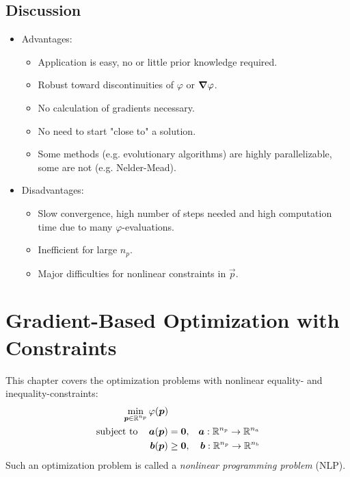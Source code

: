 	\section{Discussion}
		\begin{itemize}
			\item Advantages:
				\begin{itemize}
					\item Application is easy, no or little prior knowledge required.
					\item Robust toward discontinuities of \(\varphi\) or \(\grad{\varphi}\).
					\item No calculation of gradients necessary.
					\item No need to start "close to" a solution.
					\item Some methods (e.g. evolutionary algorithms) are highly parallelizable, some are not (e.g. Nelder-Mead).
				\end{itemize}
			\item Disadvantages:
				\begin{itemize}
					\item Slow convergence, high number of steps needed and high computation time due to many \(\varphi\)-evaluations.
					\item Inefficient for large \( n_p \).
					\item Major difficulties for nonlinear constraints in \(\vec{p}\).
				\end{itemize}
		\end{itemize}

\chapter{Gradient-Based Optimization with Constraints}
	This chapter covers the optimization problems with nonlinear equality- and inequality-constraints:
	\begin{align*}
		\min_{\bm{p} \in \mathbb{R}^{n_p}} & \, \varphi(\bm{p}) \\
		\mathrm{subject~to}\quad    & \,
		\begin{alignedat}[t]{3}
			\bm{a}(\bm{p}) &= \bm{0},\quad & \bm{a} : \mathbb{R}^{n_p} \to \mathbb{R}^{n_a} \\
			\bm{b}(\bm{p}) &\geq \bm{0},\quad & \bm{b} : \mathbb{R}^{n_p} \to \mathbb{R}^{n_b}
		\end{alignedat}
	\end{align*}
	Such an optimization problem is called a \emph{nonlinear programming problem} (NLP).

